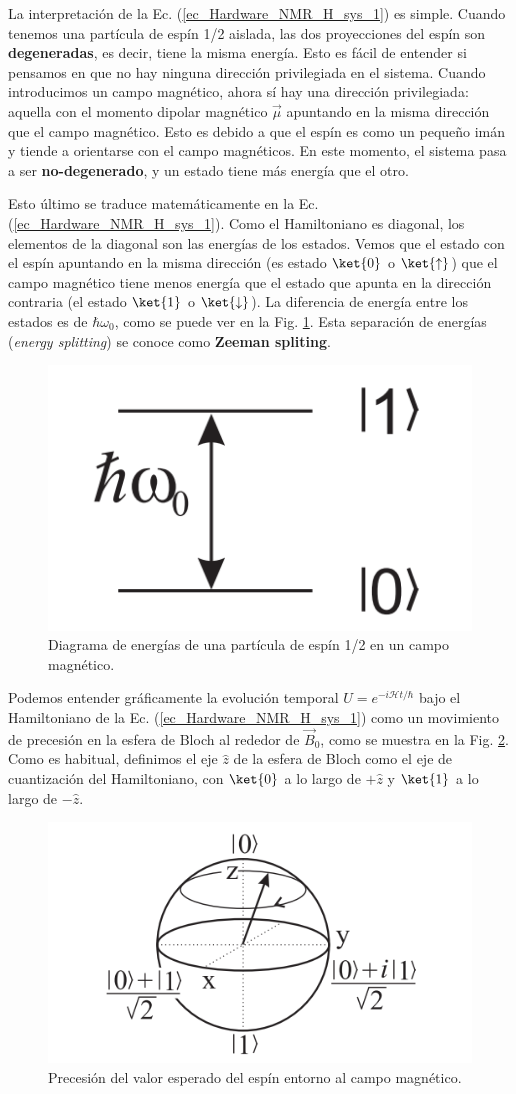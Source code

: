 \documentclass[a4paper,11pt]{book} %
\numberwithin{equation}{chapter}
\begin{document}
La interpretación de la Ec. (\ref{ec_Hardware_NMR_H_sys_1}) es simple. Cuando tenemos una partícula de espín 1/2 aislada, las dos proyecciones del espín son \textbf{degeneradas}, es decir, tiene la misma energía. Esto es fácil de entender si pensamos en que no hay ninguna dirección privilegiada en el sistema. Cuando introducimos un campo magnético, ahora sí hay una dirección privilegiada: aquella con el momento dipolar magnético $\vec{\mu}$ apuntando en la misma dirección que el campo magnético. Esto es debido a que el espín es como un pequeño imán y tiende a orientarse con el campo magnéticos. En este momento, el sistema pasa a ser \textbf{no-degenerado}, y un estado tiene más energía que el otro.

Esto último se traduce matemáticamente en la Ec. (\ref{ec_Hardware_NMR_H_sys_1}). Como el Hamiltoniano es diagonal, los elementos de la diagonal son las energías de los estados. Vemos que el estado con el espín apuntando en la misma dirección (es estado $\ket{0}$ o $\ket{\uparrow}$) que el campo magnético tiene menos energía que el estado que apunta en la dirección contraria (el estado $\ket{1}$ o $\ket{\downarrow}$). La diferencia de energía entre los estados es de $\hbar \omega_0$, como se puede ver en la Fig. \ref{Fig_Harware_NMR_split_Zeeman}. Esta separación de energías (\textit{energy splitting}) se conoce como \textbf{Zeeman spliting}.

	\begin{figure}[H]
	\centering 
	\includegraphics[width=0.15\linewidth]{Figuras/Fig_Harware_NMR_split_Zeeman}
	\caption{Diagrama de energías de una partícula de espín 1/2 en un campo magnético.}
	\label{Fig_Harware_NMR_split_Zeeman}
	\end{figure}


Podemos entender gráficamente la evolución temporal $U = e^{-i \mathcal{H} t/ \hbar}$ bajo el Hamiltoniano de la Ec. (\ref{ec_Hardware_NMR_H_sys_1}) como un movimiento de precesión en la esfera de Bloch al rededor de $\vec{B}_0$, como se muestra en la Fig. \ref{Fig_Harware_NMR_precesion}. Como es habitual, definimos el eje $\hat{z}$ de la esfera de Bloch como el eje de cuantización del Hamiltoniano, con $\ket{0}$ a lo largo de $+\hat{z}$ y $\ket{1}$ a lo largo de $-\hat{z}$.

	\begin{figure}[H]
	\centering 
	\includegraphics[width=0.45\linewidth]{Figuras/Fig_Harware_NMR_precesion.png}
	\caption{Precesión del valor esperado del espín entorno al campo magnético.}
	\label{Fig_Harware_NMR_precesion}
	\end{figure}
\end{document}
